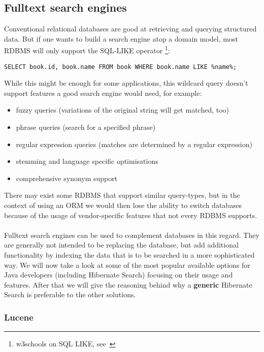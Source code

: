 \subsection{Fulltext search engines}

Conventional relational databases are good at retrieving and querying structured data. But if one wants to build a search engine atop a domain model, most RDBMS will only support the SQL-LIKE operator \footnote{w3schools on SQL LIKE, see~\cite{sql_like_w3schools}}:\\

\lstset{language=sql}
\begin{lstlisting}[frame=htrbl, caption={SQL LIKE operator in use}, label={lst:result2}]
SELECT book.id, book.name FROM book WHERE book.name LIKE %name%;
\end{lstlisting}
While this might be enough for some applications, this wildcard query doesn't support features a good search engine would need, for example:

\begin{itemize}
	\item fuzzy queries (variations of the original string will get matched, too)
	\item phrase queries (search for a specified phrase)
	\item regular expression queries (matches are determined by a regular expression)
	\item stemming and language specific optimisations
	\item comprehensive synonym support
\end{itemize}
There may exist some RDBMS that support similar query-types, but in the context of using an ORM we would then lose the ability to switch databases because of the usage of vendor-specific features that not every RDBMS supports.
\\\\
Fulltext search engines can be used to complement databases in this regard. They are generally not intended to be replacing the database, but add additional functionality by indexing the data that is to be searched in a more sophisticated way. We will now take a look at some of the most popular available options for Java developers (including Hibernate Search) focusing on their usage and features. After that we will give the reasoning behind why a \textbf{generic} Hibernate Search is preferable to the other solutions.

\pagebreak

\subsubsection{Lucene}

